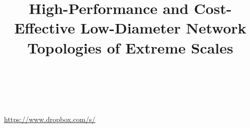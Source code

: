\documentclass[conference]{IEEEtran}
\begin{document}
\title{High-Performance and Cost-Effective Low-Diameter Network Topologies of Extreme Scales}


\author{
\IEEEauthorblockA{
%
%
} \\
}


\maketitle

\thispagestyle{plain}
\pagestyle{plain}




\begin{abstract}
%
%
%
\end{abstract}


\vspace{0.5em}
%
{\small\noindent{}\\\url{https://www.dropbox.com/s/}}












%


%
\end{document}
